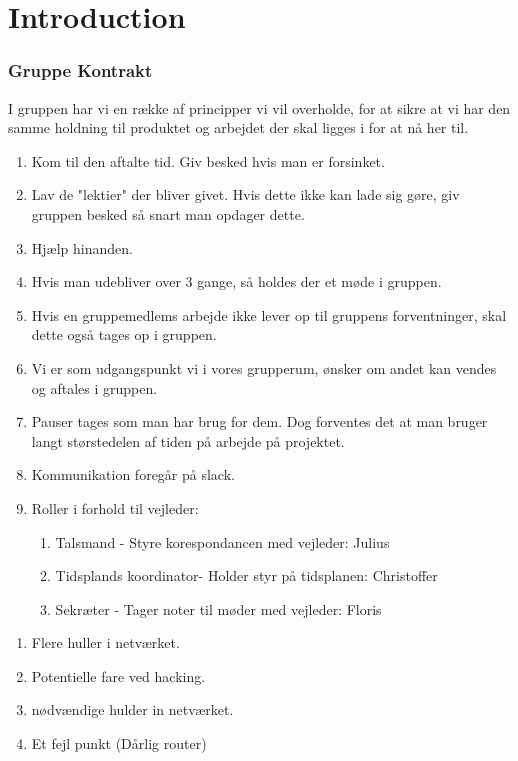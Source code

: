 



\chapter{Introduction}

\subsection{Gruppe Kontrakt}
I gruppen har vi en række af principper vi vil overholde, for at sikre at vi har den samme holdning til produktet og arbejdet der skal ligges i for at nå her til.
\begin{enumerate}
	\item Kom til den aftalte tid. Giv besked hvis man er forsinket.
	\item Lav de "lektier" der bliver givet. Hvis dette ikke kan lade sig 		gøre, giv gruppen besked så snart man opdager dette.
	\item Hjælp hinanden.
	\item Hvis man udebliver over 3 gange, så holdes der et møde i gruppen.
	\item Hvis en gruppemedlems arbejde ikke lever op til gruppens forventninger, skal dette også tages op i gruppen.
	\item Vi er som udgangspunkt vi i vores grupperum, ønsker om andet kan vendes og aftales i gruppen.
	\item Pauser tages som man har brug for dem. Dog forventes det at man bruger langt størstedelen af tiden på arbejde på projektet. 
	\item Kommunikation foregår på slack.
	\item Roller i forhold til vejleder:
	\begin{enumerate}
	    \item Talsmand - Styre korespondancen med vejleder: Julius
	    \item Tidsplands koordinator- Holder styr på tidsplanen: Christoffer
	    \item Sekræter - Tager noter til møder med vejleder: Floris
	\end{enumerate}
\end{enumerate}


\newpage






\begin{enumerate}
    \item Flere huller i netværket.
    \item Potentielle fare ved hacking.
    \item nødvændige hulder in netværket.
    \item Et fejl punkt (Dårlig router)
\end{enumerate}







